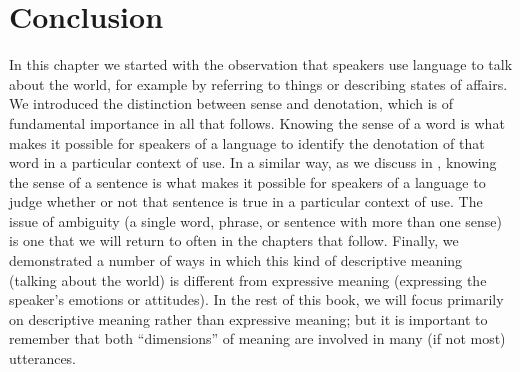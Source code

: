 \section{Conclusion}\label{sec:2.7}

In this chapter we started with the observation that speakers use language to talk about the world, for example by referring to things or describing states of affairs. We introduced the distinction between sense and denotation, which is of fundamental importance in all that follows. Knowing the sense of a word is what makes it possible for speakers of a language to identify the denotation of that word in a particular context of use. In a similar way, as we discuss in , knowing the sense of a sentence is what makes it possible for speakers of a language to judge whether or not that sentence is true in a particular context of use. The issue of ambiguity (a single word, phrase, or sentence with more than one sense) is one that we will return to often in the chapters that follow. Finally, we demonstrated a number of ways in which this kind of descriptive meaning (talking about the world) is different from expressive meaning (expressing the speaker’s emotions or attitudes). In the rest of this book, we will focus primarily on descriptive meaning rather than expressive meaning; but it is important to remember that both “dimensions” of meaning are involved in many (if not most) utterances.\clearpage




